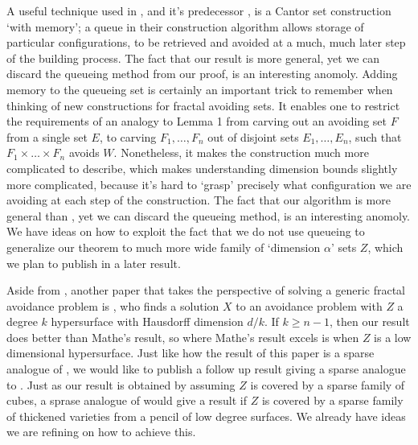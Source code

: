 \documentclass{article}
\theoremstyle{plain}
\theoremstyle{plain}
\begin{document}
A useful technique used in \cite{MalabikaRob}, and it's predecessor \cite{KeletiDimOneSet}, is a Cantor set construction `with memory'; a queue in their construction algorithm allows storage of particular configurations, to be retrieved and avoided at a much, much later step of the building process. The fact that our result is more general, yet we can discard the queueing method from our proof, is an interesting anomoly. Adding memory to the queueing set is certainly an important trick to remember when thinking of new constructions for fractal avoiding sets. It enables one to restrict the requirements of an analogy to Lemma 1 from carving out an avoiding set $F$ from a single set $E$, to carving $F_1, \dots, F_n$ out of disjoint sets $E_1, \dots, E_n$, such that $F_1 \times \dots \times F_n$ avoids $W$. Nonetheless, it makes the construction much more complicated to describe, which makes understanding dimension bounds slightly more complicated, because it's hard to `grasp' precisely what configuration we are avoiding at each step of the construction. The fact that our algorithm is more general than \cite{MalabikaRob}, yet we can discard the queueing method, is an interesting anomoly. We have ideas on how to exploit the fact that we do not use queueing to generalize our theorem to much more wide family of `dimension $\alpha$' sets $Z$, which we plan to publish in a later result.

Aside from \cite{MalabikaRob}, another paper that takes the perspective of solving a generic fractal avoidance problem is \cite{Mathe}, who finds a solution $X$ to an avoidance problem with $Z$ a degree $k$ hypersurface with Hausdorff dimension $d/k$. If $k \geq n-1$, then our result does better than Mathe's result, so where Mathe's result excels is when $Z$ is a low dimensional hypersurface. Just like how the result of this paper is a sparse analogue of \cite{MalabikaRob}, we would like to publish a follow up result giving a sparse analogue to \cite{Mathe}. Just as our result is obtained by assuming $Z$ is covered by a sparse family of cubes, a sprase analogue of \cite{Mathe} would give a result if $Z$ is covered by a sparse family of thickened varieties from a pencil of low degree surfaces. We already have ideas we are refining on how to achieve this.
\end{document}
